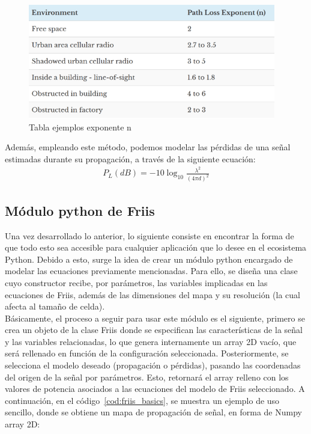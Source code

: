 \begin{figure} [t]
	\begin{center}
	\includegraphics[height=5cm]{imagenes/cap4/4_PLE_table.png}
	\end{center}
	\caption[Tabla ejemplos exponente n]{Tabla ejemplos exponente n}
	\label{fig:ple_table}
\end{figure}

Además, empleando este método, podemos modelar las pérdidas de una señal estimadas durante su propagación, a través de la siguiente ecuación:\\

\begin{align}
    P_L(dB) = -10 \log_{10} \frac{\lambda^2}{(4 \pi d)^2}
\end{align}

\subsection{Módulo python de Friis}
\label{subsec:friis-module}

Una vez desarrollado lo anterior, lo siguiente consiste en encontrar la forma de que todo esto sea accesible para cualquier aplicación que lo desee en el ecosistema Python. Debido a esto, surge la idea de crear un módulo python encargado de modelar las ecuaciones previamente mencionadas. Para ello, se diseña una clase cuyo constructor recibe, por parámetros, las variables implicadas en las ecuaciones de Friis, además de las dimensiones del mapa y su resolución (la cual afecta al tamaño de celda).\\

Básicamente, el proceso a seguir para usar este módulo es el siguiente, primero se crea un objeto de la clase Friis donde se especifican las características de la señal y las variables relacionadas, lo que genera internamente un array 2D vacío, que será rellenado en función de la configuración seleccionada. Posteriormente, se selecciona el modelo deseado (propagación o pérdidas), pasando las coordenadas del origen de la señal por parámetros. Esto, retornará el array relleno con los valores de potencia asociados a las ecuaciones del modelo de Friis seleccionado. A continuación, en el código~\ref{cod:friis_basics}, se muestra un ejemplo de uso sencillo, donde se obtiene un mapa de propagación de señal, en forma de Numpy array 2D:

